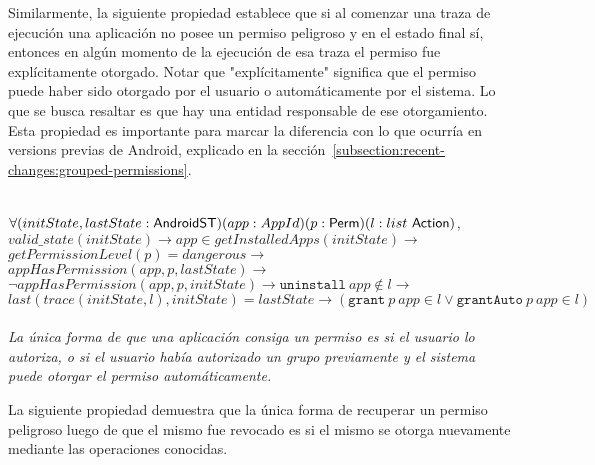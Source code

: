Similarmente, la siguiente propiedad establece que si al comenzar una traza de ejecución una
aplicación no posee un permiso peligroso y en el estado final sí, entonces en algún momento de la
ejecución de esa traza el permiso fue explícitamente otorgado. Notar que "explícitamente" significa
que el permiso puede haber sido otorgado por el usuario o automáticamente por el sistema. Lo que se
busca resaltar es que hay una entidad responsable de ese otorgamiento. Esta propiedad es importante
para marcar la diferencia con lo que ocurría en versions previas de Android, explicado en la
sección~\ref{subsection:recent-changes:grouped-permissions}.

\begin{prop}
    \label{impproperty2}
    \mbox{} \\
    $	\forall
        (initState,lastState:\mathsf{AndroidST})
        (app:AppId)
        (p:\mathsf{Perm})
        (l: list\ \mathsf{Action})$, \\
    $	valid\_state(initState) \rightarrow
        app \in getInstalledApps(initState) \rightarrow$ \\
    $	getPermissionLevel(p)= dangerous \rightarrow $\\
    $	appHasPermission(app,p,lastState) \rightarrow$\\
    $	\neg appHasPermission(app,p,initState)\rightarrow
        \texttt{uninstall}~app \notin l \rightarrow $ \\
    $	last(trace(initState,l),initState) = lastState \rightarrow
        (\texttt{grant}~p~app \in l \lor \texttt{grantAuto}~p~app \in l)$ \\ \\
    \textit{La única forma de que una aplicación consiga un permiso es si el usuario lo autoriza, o
        si el usuario había autorizado un grupo previamente y el sistema puede otorgar el permiso
        automáticamente.}
\end{prop}

La siguiente propiedad demuestra que la única forma de recuperar un permiso peligroso luego de que
el mismo fue revocado es si el mismo se otorga nuevamente mediante las operaciones conocidas.

